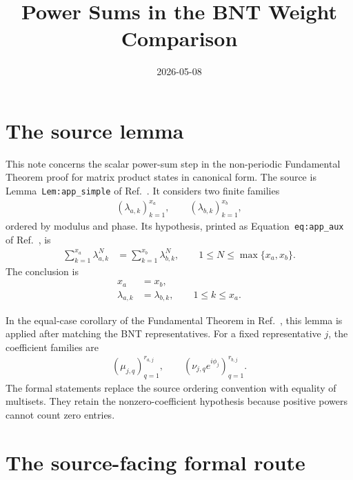 \documentclass{article}
\title{Power Sums in the BNT Weight Comparison}
\author{}
\date{2026-05-08}
\begin{document}
\maketitle
{}

\section{The source lemma}

This note concerns the scalar power-sum step in the non-periodic Fundamental
Theorem proof for matrix product states in canonical form. The source is
Lemma~\texttt{Lem:app\_simple} of
Ref.~\cite[lines~1155--1163]{Cirac2016MPDO_arXiv}. It considers two finite
families
\begin{align}
    (\lambda_{a,k})_{k=1}^{x_a},
    \qquad
    (\lambda_{b,k})_{k=1}^{x_b},
    \label{eq:cpsv16_power_sum_alternative_route_source_families}
\end{align}
ordered by modulus and phase. Its hypothesis, printed as
Equation~\texttt{eq:app\_aux} of Ref.~\cite{Cirac2016MPDO_arXiv}, is
\begin{align}
    \sum_{k=1}^{x_a}\lambda_{a,k}^{N}
        &=\sum_{k=1}^{x_b}\lambda_{b,k}^{N},
        \qquad
        1\leq N\leq\max\{x_a,x_b\}.
    \label{eq:cpsv16_power_sum_alternative_route_source_power_sums}
\end{align}
The conclusion is
\begin{align}
    x_a
        &=x_b,
    \label{eq:cpsv16_power_sum_alternative_route_source_cardinality}\\
    \lambda_{a,k}
        &=\lambda_{b,k},
        \qquad 1\leq k\leq x_a.
    \label{eq:cpsv16_power_sum_alternative_route_source_ordered_equality}
\end{align}

In the equal-case corollary of the Fundamental Theorem in
Ref.~\cite{Cirac2016MPDO_arXiv}, this lemma is applied after matching the BNT
representatives. For a fixed representative $j$, the coefficient families are
\begin{align}
    (\mu_{j,q})_{q=1}^{r_{a,j}},
    \qquad
    (\nu_{j,q}e^{i\phi_j})_{q=1}^{r_{b,j}}.
    \label{eq:cpsv16_power_sum_alternative_route_bnt_weight_families}
\end{align}
The formal statements replace the source ordering convention with equality of
multisets. They retain the nonzero-coefficient hypothesis because positive
powers cannot count zero entries.

\section{The source-facing formal route}
\end{document}
